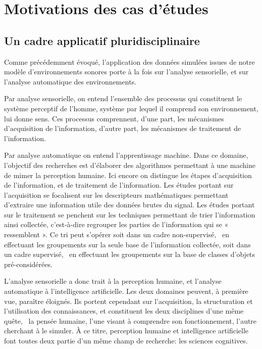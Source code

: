 
\section{Motivations des cas d'études}

\subsection{Un cadre applicatif pluridisciplinaire}

Comme précédemment évoqué, l'application des données simulées issues de notre modèle d’environnements sonores porte à la fois sur l'analyse sensorielle, et sur l'analyse automatique des environnements.

Par analyse sensorielle, on entend l'ensemble des processus qui constituent le système perceptif de l'homme, système par lequel il comprend son environnement, lui donne sens. Ces processus comprennent, d'une part, les mécanismes d'acquisition de l'information, d'autre part, les mécanismes de traitement de l'information.

Par analyse automatique on entend l'apprentissage machine. Dans ce domaine, l'objectif des recherches est d'élaborer des algorithmes permettant à une machine de mimer la perception humaine. Ici encore on distingue les étapes d'acquisition de l'information, et de traitement de l'information. Les études portant sur l'acquisition se focalisent sur les descripteurs mathématiques permettant d'extraire une information utile des données brutes du signal. Les études portant sur le traitement se penchent sur les techniques permettant de trier l'information ainsi collectée, c’est-à-dire regrouper les parties de l'information qui se « ressemblent ». Ce tri peut s'opérer soit dans un cadre non-supervisé, \ie~en effectuant les groupements sur la seule base de l'information collectée, soit dans un cadre supervisé, \ie~en effectuant les groupements sur la base de classes d'objets pré-considérées.

L'analyse sensorielle a donc trait à la perception humaine, et l'analyse automatique à l'intelligence artificielle. Les deux domaines peuvent, à première vue, paraître éloignés. Ils portent cependant sur l'acquisition, la structuration et l'utilisation des connaissances, et constituent les deux disciplines d'une même quête, \ie~la pensée humaine, l'une visant à comprendre son fonctionnement, l'autre cherchant à le simuler. À ce titre, perception humaine et intelligence artificielle font toutes deux partie d'un même champ de recherche: les sciences cognitives.

